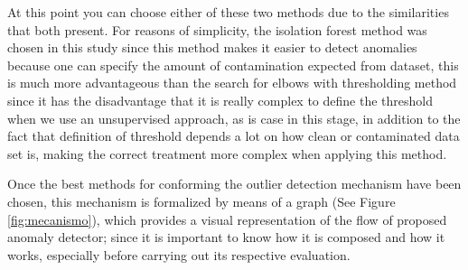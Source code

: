 At this point you can choose either of these two methods due to the similarities that both present. For reasons of simplicity, the isolation forest method was chosen in this study since this method makes it easier to detect anomalies because one can specify the amount of contamination expected from dataset, this is much more advantageous than the search for elbows with thresholding method since it has the disadvantage that it is really complex to define the threshold when we use an unsupervised approach, as is case in this stage, in addition to the fact that definition of threshold depends a lot on how clean or contaminated data set is, making the correct treatment more complex when applying this method.

\vspace{5mm} %

Once the best methods for conforming the outlier detection mechanism have been chosen, this mechanism is formalized by means of a graph (See Figure \ref{fig:mecanismo}), which provides a visual representation of the flow of proposed anomaly detector; since it is important to know how it is composed and how it works, especially before carrying out its respective evaluation.

